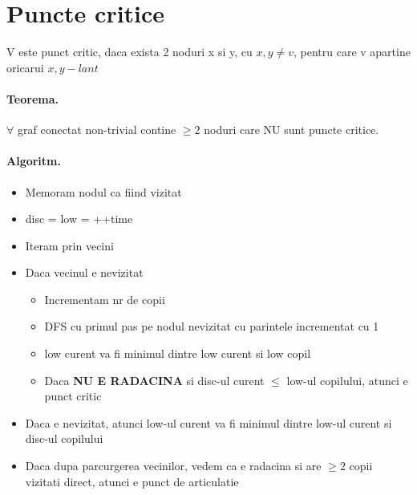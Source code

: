 \documentclass{article}
\begin{document}
\section{Puncte critice} V este punct critic, daca exista 2 noduri x si y, cu $x,y \neq v$, pentru care v apartine oricarui $x,y-lant$

\paragraph*{Teorema.} $\forall$ graf conectat non-trivial contine $\geq 2$ noduri care NU sunt puncte critice.

\paragraph*{Algoritm.}
\begin{itemize}
    \item Memoram nodul ca fiind vizitat
    \item disc = low = ++time
    \item Iteram prin vecini
    \item Daca vecinul e nevizitat
          \begin{itemize}
              \item Incrementam nr de copii
              \item DFS cu primul pas pe nodul nevizitat cu parintele incrementat cu 1
              \item low curent va fi minimul dintre low curent si low copil
              \item Daca \textbf{NU E RADACINA} si disc-ul curent $\leq$ low-ul copilului, atunci e punct critic
          \end{itemize}
    \item Daca e nevizitat, atunci low-ul curent va fi minimul dintre low-ul curent si disc-ul copilului
    \item Daca dupa parcurgerea vecinilor, vedem ca e radacina si are $\geq 2$ copii vizitati direct, atunci e punct de articulatie
\end{itemize}
\end{document}
